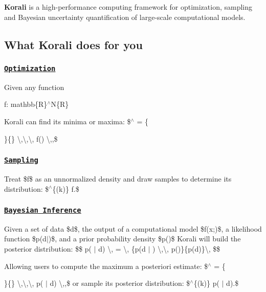 {\bfseries Korali} is a high-\/performance computing framework for optimization, sampling and Bayesian uncertainty quantification of large-\/scale computational models.

\subsection*{What Korali does for you}

\subsubsection*{\href{/tutorials/optimization/optimization}{\tt Optimization}}

Given any function \begin{DoxyParagraph}{f\-:}
mathbb\{R\}$^\wedge$\-N\{R\}
\end{DoxyParagraph}
Korali can find its minima or maxima\-: \$$^\wedge$ = \{\begin{DoxyItemize}
\item \}\{\} \textbackslash{},\textbackslash{},\textbackslash{}, f() \textbackslash{},,\$\end{DoxyItemize}
\subsubsection*{\href{/tutorials/sampling/sampling}{\tt Sampling}}

Treat \$f\$ as an unnormalized density and draw samples to determine its distribution\-: \$$^\wedge$\{(k)\}  f.\$

\subsubsection*{\href{/tutorials/bayesian/bayesian}{\tt Bayesian Inference}}

Given a set of data \$d\$, the output of a computational model \$f(x;)\$, a likelihood function \$p(d$|$)\$, and a prior probability density \$p()\$ Korali will build the posterior distribution\-: \$\$ p( $|$ d) \textbackslash{}, = \textbackslash{}, \{p(d $|$ ) \textbackslash{},\textbackslash{}, p()\}\{p(d)\}\textbackslash{}, \$\$

Allowing users to compute the maximum a posteriori estimate\-: \$$^\wedge$ = \{\begin{DoxyItemize}
\item \}\{\} \textbackslash{},\textbackslash{},\textbackslash{}, p( $|$ d) \textbackslash{},,\$ or sample its posterior distribution\-: \$$^\wedge$\{(k)\}  p( $|$ d).\$\end{DoxyItemize}
